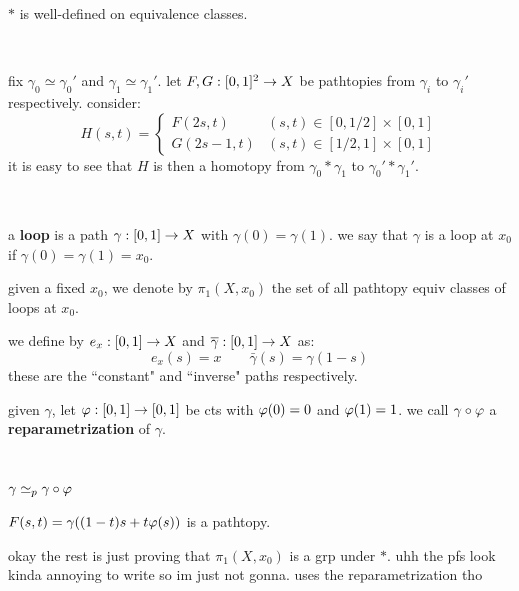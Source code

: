 \begin{prop}
    $*$ is well-defined on equivalence classes.
\end{prop} \

\begin{pf}[source=Primary Source Material]
    fix $\gamma_{0}\simeq\gamma_{0}'$ and $\gamma_{1}\simeq\gamma_{1}'$.
    let $F,G:[0,1]^{2}\rightarrow X$ be pathtopies from $\gamma_{i}$ to $\gamma_{i}'$
    respectively. consider:
    \begin{equation*}
        H(s,t)=
        \begin{cases}
            F(2s,t) & (s,t)\in[0,1/2]\times[0,1] \\
            G(2s-1,t) & (s,t)\in[1/2,1]\times[0,1]
        \end{cases}
    \end{equation*}
    it is easy to see that $H$ is then a homotopy from $\gamma_{0}*\gamma_{1}$
    to $\gamma_{0}'*\gamma_{1}'$.
\end{pf} \

\begin{defn}
    a \textbf{loop} is a path $\gamma:[0,1]\rightarrow X$ with $\gamma(0)=\gamma(1)$.
    we say that $\gamma$ is a loop at $x_{0}$ if $\gamma(0)=\gamma(1)=x_{0}$.

    given a fixed $x_{0}$, we denote by $\pi_{1}(X,x_{0})$ the set of all
    pathtopy equiv classes of loops at $x_{0}$.
\end{defn}
we define by $e_{x}:[0,1]\rightarrow X$ and $\overline{\gamma}:[0,1]\rightarrow X$ as:
\begin{equation*}
    e_{x}(s)=x \qquad \bar{\gamma}(s)=\gamma(1-s)
\end{equation*}
these are the ``constant" and ``inverse" paths respectively.

\begin{defn}
    given $\gamma$, let $\varphi:[0,1]\rightarrow[0,1]$ be cts with $\varphi(0)=0$ and
    $\varphi(1)=1$.
    we call $\gamma\circ\varphi$ a \textbf{reparametrization} of $\gamma$.
\end{defn} \

\begin{lm}
    $\gamma\simeq_{p}\gamma\circ\varphi$
\end{lm}

\begin{pf}[source=Primary Source Material]
    $F(s,t)=\gamma((1-t)s + t\varphi(s))$ is a pathtopy.
\end{pf}

okay the rest is just proving that $\pi_{1}(X,x_{0})$ is a grp under $*$.
uhh the pfs look kinda annoying to write so im just        not gonna.
uses the reparametrization tho

